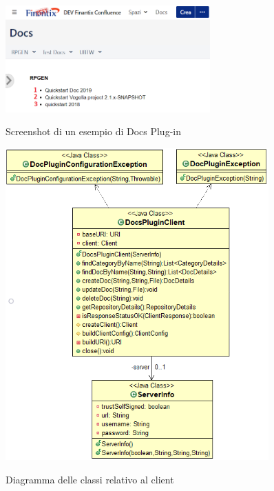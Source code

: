 	\begin{figure}[H]
		\centering
		\includegraphics[width=0.7\textwidth]{immagini/DocsExamples.png}\\
		\caption{Screenshot di un esempio di Docs Plug-in}
	\end{figure}





\begin{figure}[H]
    \centering
    \includegraphics[width=0.9\textwidth]{immagini/client.png}\\
    \caption{Diagramma delle classi relativo al client}
\end{figure}

